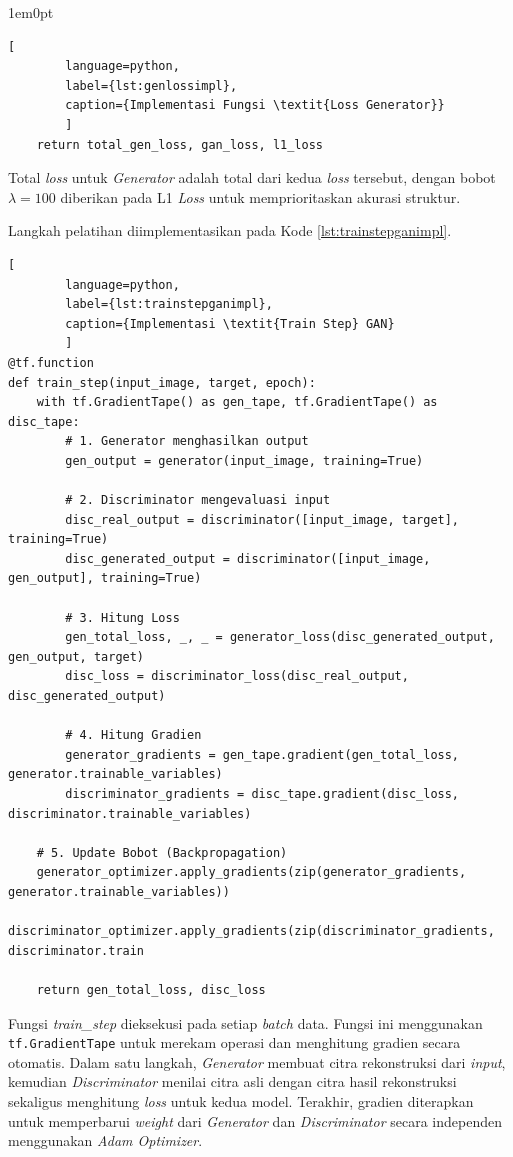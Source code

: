 \begin{adjustwidth}{1em}{0pt}
\begin{lstlisting}[
		language=python,
		label={lst:genlossimpl},
		caption={Implementasi Fungsi \textit{Loss Generator}}
		]
	return total_gen_loss, gan_loss, l1_loss
	\end{lstlisting}
	
	Total \textit{loss} untuk \textit{Generator} adalah total dari kedua \textit{loss} tersebut, dengan bobot $\lambda = 100$ diberikan pada L1 \textit{Loss} untuk memprioritaskan akurasi struktur.
	
	Langkah pelatihan diimplementasikan pada Kode \ref{lst:trainstepganimpl}.
	
	\begin{lstlisting}[
		language=python,
		label={lst:trainstepganimpl},
		caption={Implementasi \textit{Train Step} GAN}
		]
@tf.function
def train_step(input_image, target, epoch):
	with tf.GradientTape() as gen_tape, tf.GradientTape() as disc_tape:
		# 1. Generator menghasilkan output
		gen_output = generator(input_image, training=True)
		
		# 2. Discriminator mengevaluasi input
		disc_real_output = discriminator([input_image, target], training=True)
		disc_generated_output = discriminator([input_image, gen_output], training=True)
		
		# 3. Hitung Loss
		gen_total_loss, _, _ = generator_loss(disc_generated_output, gen_output, target)
		disc_loss = discriminator_loss(disc_real_output, disc_generated_output)
		
		# 4. Hitung Gradien
		generator_gradients = gen_tape.gradient(gen_total_loss, generator.trainable_variables)
		discriminator_gradients = disc_tape.gradient(disc_loss, discriminator.trainable_variables)
		
	# 5. Update Bobot (Backpropagation)
	generator_optimizer.apply_gradients(zip(generator_gradients, generator.trainable_variables))
	discriminator_optimizer.apply_gradients(zip(discriminator_gradients, discriminator.train
	
	return gen_total_loss, disc_loss
	\end{lstlisting}
	
	Fungsi \textit{train\_step} dieksekusi pada setiap \textit{batch} data. Fungsi ini menggunakan \texttt{tf.GradientTape} untuk merekam operasi dan menghitung gradien secara otomatis. Dalam satu langkah, \textit{Generator} membuat citra rekonstruksi dari \textit{input}, kemudian \textit{Discriminator} menilai citra asli dengan citra hasil rekonstruksi sekaligus menghitung \textit{loss} untuk kedua model. Terakhir, gradien diterapkan untuk memperbarui \textit{weight} dari \textit{Generator} dan \textit{Discriminator} secara independen menggunakan \textit{Adam Optimizer}.
\end{adjustwidth}



